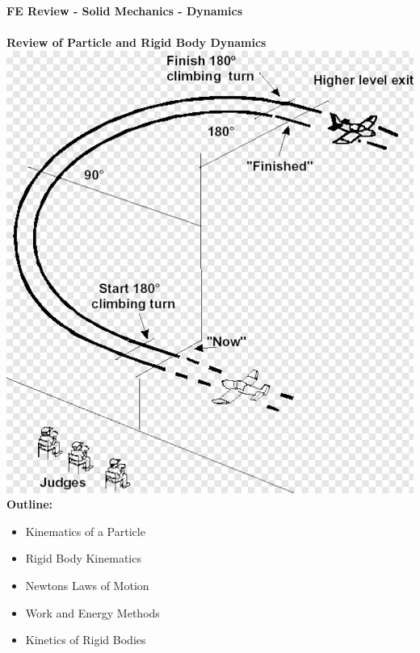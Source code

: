 \documentclass[11pt]{article}
\begin{document}
\textbf{ \LARGE FE Review - Solid Mechanics - Dynamics} \\\\
\textbf{ \LARGE Review of Particle and Rigid Body Dynamics } \\
		
		\LARGE
		\includegraphics[scale=.25]{lecture1_fig1.png}\\
		\textbf{Outline:}\\
		
		\begin{itemize}
			\item Kinematics of a Particle
			\item Rigid Body Kinematics
			\item Newtons Laws of Motion
			\item Work and Energy Methods
			\item Kinetics of Rigid Bodies
		\end{itemize}
\end{document}
